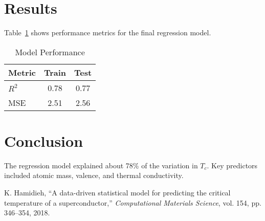 \documentclass[conference]{IEEEtran}
\begin{document}
\section{Results}
Table~\ref{tab:results} shows performance metrics for the final regression model.

\begin{table}[htbp]
  \caption{Model Performance}
  \centering
  \begin{tabular}{lcc}
    \toprule
    Metric & Train & Test \\
    \midrule
    $R^2$       & 0.78 & 0.77 \\
    MSE         & 2.51 & 2.56 \\
    \bottomrule
  \end{tabular}
  \label{tab:results}
\end{table}

\section{Conclusion}
The regression model explained about 78\% of the variation in $T_c$. 
Key predictors included atomic mass, valence, and thermal conductivity.

\begin{thebibliography}{00}
K. Hamidieh, ``A data-driven statistical model for predicting the critical temperature of a superconductor,'' 
\emph{Computational Materials Science}, vol. 154, pp. 346--354, 2018.
\end{thebibliography}
\end{document}
